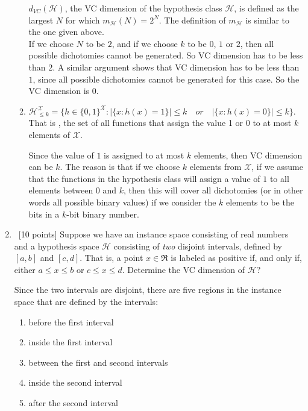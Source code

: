 \begin{enumerate}
\begin{enumerate}
$d_{VC}(\mathcal{H})$, the VC dimension of the hypothesis class $\mathcal{H}$, is defined as the largest $N$ for which $m_{\mathcal{H}}(N) = 2^N$. The definition of $m_{\mathcal{H}} $ is similar to the one given above.\\

If we choose $N$ to be $2$, and if we choose $k$ to be $0$, $1$ or $2$, then all possible dichotomies cannot be generated. So VC dimension has to be less than $2$. A similar argument shows that VC dimension has to be less than $1$, since all possible dichotomies cannot be generated for this case. So the VC dimension is $0$.

  \item  $\mathcal{H}_{\leq k}^{\mathcal{X}} = \{h \in
    \{0,1\}^\mathcal{X} : |\{x : h(x) = 1\} | \leq k \quad or \quad |\{x
      : h(x) = 0\} | \leq k\}$. That is , the set of all functions that
    assign the value 1 or 0 to at most $k$ elements of $\mathcal{X}$.

Since the value of $1$ is assigned to at most $k$ elements, then VC dimension can be $k$. The reason is that if we choose $k$ elements from $\mathcal{X}$, if we assume that the functions in the hypothesis class will assign a value of $1$ to all elements between $0$ and $k$, then this will cover all dichotomies (or in other words all possible binary values) if we consider the $k$ elements to be the bits in a $k$-bit binary number. 

  \end{enumerate}

\item ~[10 points] Suppose we have an instance space consisting of
  real numbers and a hypothesis space $\mathcal{H}$ consisting of {\em
    two} disjoint intervals, defined by $[a, b]$ and $[c, d]$. That
  is, a point $x \in \Re$ is labeled as positive if, and only if,
  either $a \leq x \leq b$ or $c \leq x \leq d$. Determine the VC
  dimension of $\mathcal{H}$?

Since the two intervals are disjoint, there are five regions in the instance space that are defined by the intervals:

\begin{enumerate}
\item before the first interval
\item inside the first interval
\item between the first and second intervals
\item inside the second interval
\item after the second interval
\end{enumerate}


\end{enumerate}
